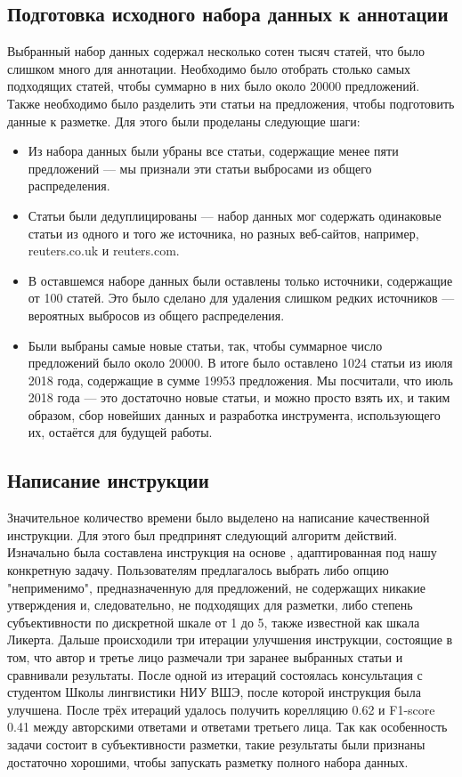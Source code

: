 \documentclass[conference]{IEEEtran}
\begin{document}
\subsection{Подготовка исходного набора данных к аннотации}
Выбранный набор данных содержал несколько сотен тысяч статей, что было слишком много для аннотации. Необходимо было отобрать столько самых подходящих статей, чтобы суммарно в них было около 20000 предложений. Также необходимо было разделить эти статьи на предложения, чтобы подготовить данные к разметке. Для этого были проделаны следующие шаги:
\begin{itemize}
    \item Из набора данных были убраны все статьи, содержащие менее пяти предложений --- мы признали эти статьи выбросами из общего распределения.
    \item Статьи были дедуплицированы --- набор данных мог содержать одинаковые статьи из одного и того же источника, но разных веб-сайтов, например, reuters.co.uk и reuters.com.
    \item В оставшемся наборе данных были оставлены только источники, содержащие от 100 статей. Это было сделано для удаления слишком редких источников --- вероятных выбросов из общего распределения.
    \item Были выбраны самые новые статьи, так, чтобы суммарное число предложений было около 20000. В итоге было оставлено 1024 статьи из июля 2018 года, содержащие в сумме 19953 предложения. Мы посчитали, что июль 2018 года --- это достаточно новые статьи, и можно просто взять их, и таким образом, сбор новейших данных и разработка инструмента, использующего их, остаётся для будущей работы.
\end{itemize}

\subsection{Написание инструкции}
Значительное количество времени было выделено на написание качественной инструкции. Для этого был предпринят следующий алгоритм действий. Изначально была составлена инструкция на основе \cite{}, адаптированная под нашу конкретную задачу. Пользователям предлагалось выбрать либо опцию "неприменимо", предназначенную для предложений, не содержащих никакие утверждения и, следовательно, не подходящих для разметки, либо степень субъективности по дискретной шкале от 1 до 5, также известной как шкала Ликерта. Дальше происходили три итерации улучшения инструкции, состоящие в том, что автор и третье лицо размечали три заранее выбранных статьи и сравнивали результаты. После одной из итераций состоялась консультация с студентом Школы лингвистики НИУ ВШЭ, после которой инструкция была улучшена. После трёх итераций удалось получить корелляцию 0.62 и F1-score 0.41 между авторскими ответами и ответами третьего лица. Так как особенность задачи состоит в субъективности разметки, такие результаты были признаны достаточно хорошими, чтобы запускать разметку полного набора данных.
\end{document}

